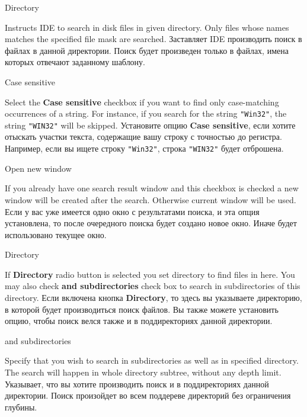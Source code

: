 \begin{popup}
\caption{Directory}

\ifenglish
Instructs IDE to search in disk files in given directory. Only files whose names
matches the specified file mask are searched.
\else
Заставляет IDE производить поиск в файлах в данной директории. Поиск будет
произведен только в файлах, имена которых отвечают заданному шаблону.
\fi
\end{popup}

\begin{popup}
\caption{Case sensitive}

\ifenglish
Select the {\bf Case sensitive} checkbox if you want to find only
case-matching occurrences of a string. For instance, if you search for
the string {\tt "Win32"}, the string {\tt "WIN32"} will be skipped.
\else
Установите опцию {\bf Case sensitive}, если хотите отыскать участки текста, 
содержащие вашу строку с точностью до регистра. Например, если вы ищете строку
{\tt "Win32"}, строка {\tt "WIN32"} будет отброшена.
\fi
\end{popup}

\begin{popup}
\caption{Open new window}

\ifenglish
If you already have one search result window and this checkbox is checked
a new window will be created after the search. Otherwise current window will
be used.
\else
Если у вас уже имеется одно окно с результатами поиска, и эта опция установлена,
то после очередного поиска будет создано новое окно. Иначе будет использовано
текущее окно.
\fi
\end{popup}

\begin{popup}
\caption{Directory}

\ifenglish
If {\bf Directory} radio button is selected you set directory to find files in here.
You may also check {\bf and subdirectories} check box to search in subdirectories of this
directory.
\else
Если включена кнопка {\bf Directory}, то здесь вы указываете директорию, в которой 
будет производиться поиск файлов. Вы также можете установить опцию, чтобы поиск 
велся также и в поддиректориях данной директории.
\fi
\end{popup}

\begin{popup}
\caption{and subdirectories}

\ifenglish
Specify that you wish to search in subdirectories as well as in specified
directory. The search will happen in whole directory subtree, without any
depth limit.
\else
Указывает, что вы хотите производить поиск и в поддиректориях данной директории.
Поиск произойдет во всем поддереве директорий без ограничения глубины.
\fi
\end{popup}


